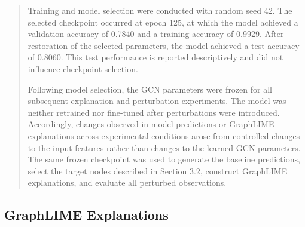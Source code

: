 \documentclass[a4paper]{article}
\begin{document}
\begin{quote}
Training and model selection were conducted with random seed 42. The
selected checkpoint occurred at epoch 125, at which the model achieved a
validation accuracy of 0.7840 and a training accuracy of 0.9929. After
restoration of the selected parameters, the model achieved a test
accuracy of 0.8060. This test performance is reported descriptively and
did not influence checkpoint selection.

Following model selection, the GCN parameters were frozen for all
subsequent explanation and perturbation experiments. The model was
neither retrained nor fine-tuned after perturbations were introduced.
Accordingly, changes observed in model predictions or GraphLIME
explanations across experimental conditions arose from controlled
changes to the input features rather than changes to the learned GCN
parameters. The same frozen checkpoint was used to generate the baseline
predictions, select the target nodes described in Section 3.2, construct
GraphLIME explanations, and evaluate all perturbed observations.
\end{quote}

\subsection{GraphLIME Explanations}\label{graphlime-explanations}
\end{document}
